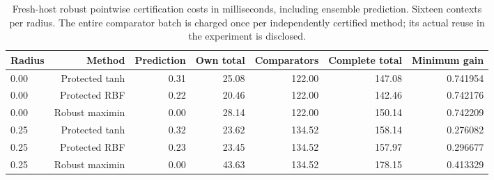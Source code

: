 \begin{table}[tbp]\centering\scriptsize
\caption{Fresh-host robust pointwise certification costs in milliseconds, including ensemble prediction. Sixteen contexts per radius. The entire comparator batch is charged once per independently certified method; its actual reuse in the experiment is disclosed.}
\label{tab:r24-robust-cost}
\begin{tabular}{lrrrrrr}
\toprule
Radius & Method & Prediction & Own total & Comparators & Complete total & Minimum gain\\
\midrule
0.00 & Protected tanh & 0.31 & 25.08 & 122.00 & 147.08 & 0.741954\\
0.00 & Protected RBF & 0.22 & 20.46 & 122.00 & 142.46 & 0.742176\\
0.00 & Robust maximin & 0.00 & 28.14 & 122.00 & 150.14 & 0.742209\\
0.25 & Protected tanh & 0.32 & 23.62 & 134.52 & 158.14 & 0.276082\\
0.25 & Protected RBF & 0.23 & 23.45 & 134.52 & 157.97 & 0.296677\\
0.25 & Robust maximin & 0.00 & 43.63 & 134.52 & 178.15 & 0.413329\\
\bottomrule
\end{tabular}
\end{table}

